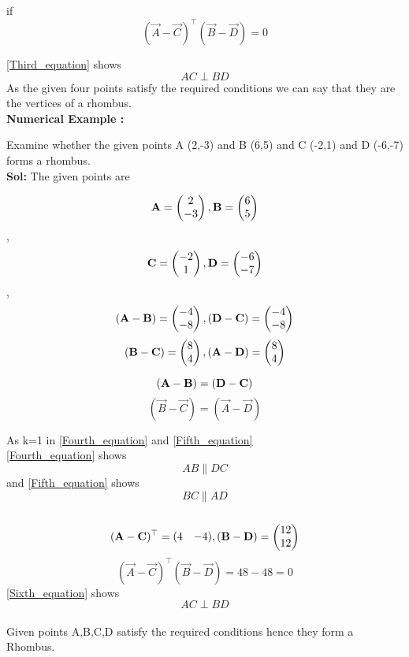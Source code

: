 \documentclass{article}
\begin{document}
if 
\begin{equation}\label{Third_equation}
(\vec{A}-\vec{C} )^ \top ( \vec{B}-\vec{D} ) = 0 
\end{equation}

\ref{Third_equation} shows
$$AC \perp BD $$
{As the given four points satisfy the required conditions we can say that they are the vertices of a rhombus.}\\
\textbf{Numerical Example :}
 
{Examine whether the given points A (2,-3) and B (6,5) and C (-2,1) and D (-6,-7) forms a rhombus.}\\

 \textbf{Sol:}
 The given points are

$$\vec{A} = \myvec{2\\-3}, \vec{B} =\myvec{6\\5}$$,
$$\vec{C} =\myvec{-2\\1}, \vec{D} =\myvec{-6\\-7}$$,
$$(\vec{A}-\vec{B} ) = \myvec{-4\\-8}, (\vec{D}-\vec{C} ) = \myvec{-4\\-8}$$
$$(\vec{B}-\vec{C} ) = \myvec{8\\4}, (\vec{A}-\vec{D} ) = \myvec{8\\4}$$

\begin{equation}\label{Fourth_equation}
(\vec{A}-\vec{B} ) = (\vec{D}-\vec{C} )  \\
\end{equation}
\begin{equation}\label{Fifth_equation}
(\vec{B}-\vec{C} )  = (\vec{A}-\vec{D} ) 
\end{equation}

 {As k=1 in \ref{Fourth_equation} and \ref{Fifth_equation}}\\
 {}
\ref{Fourth_equation} shows $$ AB  {\parallel} DC $$ and \ref{Fifth_equation} shows $$BC \parallel AD $$\\
$$(\vec{A}-\vec{C} )^\top = \begin{matrix}
(4 & -4 )
\end{matrix},(\vec{B}-\vec{D} ) = \myvec{12\\12}$$
\begin{equation}\label{Sixth_equation}
(\vec{A}-\vec{C} )^ \top ( \vec{B}-\vec{D} ) = 48-48 = 0
\end{equation}
 \ref{Sixth_equation} shows
$$AC \perp BD $$\\ 
{Given points A,B,C,D satisfy the required 
conditions hence they form a Rhombus.}
\end{document}

